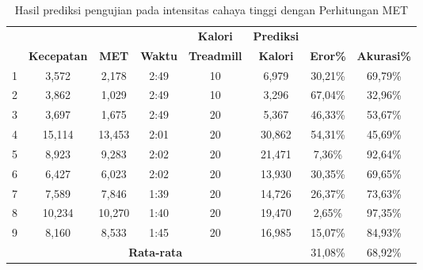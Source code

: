 \begin{longtable}{|c|c|c|c|c|c|c|c|}
  \caption{Hasil prediksi pengujian pada intensitas cahaya tinggi dengan Perhitungan MET}
  \label{tb:PengujianIntensitasTinggiAnalisaPrediksiPerhitungan}                                   \\
  \hline
  \rowcolor[HTML]{C0C0C0}
  & & & & \textbf{Kalori} & \textbf{Prediksi} & & \\
  \rowcolor[HTML]{C0C0C0}
  \multirow{-2}{*}{\textbf{Percobaan}} & \multirow{-2}{*}{\textbf{Kecepatan}} & \multirow{-2}{*}{\textbf{MET}} & \multirow{-2}{*}{\textbf{Waktu}} & \textbf{Treadmill} & \textbf{Kalori} & \multirow{-2}{*}{\textbf{Eror\%}} & \multirow{-2}{*}{\textbf{Akurasi\%}} \\
  \hline
  1   & 3,572   & 2,178    & 2:49    & 10   & 6,979   & 30,21\%     & 69,79\%   \\
  \hline
  2   & 3,862   & 1,029    & 2:49    & 10   & 3,296   & 67,04\%     & 32,96\%   \\
  \hline
  3   & 3,697   & 1,675    & 2:49    & 20   & 5,367   & 46,33\%     & 53,67\%   \\
  \hline
  4   & 15,114  & 13,453   & 2:01    & 20   & 30,862  & 54,31\%     & 45,69\%   \\
  \hline
  5   & 8,923   & 9,283    & 2:02    & 20   & 21,471  & 7,36\%      & 92,64\%   \\
  \hline
  6   & 6,427   & 6,023    & 2:02    & 20   & 13,930  & 30,35\%     & 69,65\%   \\
  \hline
  7   & 7,589   & 7,846    & 1:39    & 20   & 14,726  & 26,37\%     & 73,63\%   \\
  \hline
  8   & 10,234  & 10,270   & 1:40    & 20   & 19,470  & 2,65\%      & 97,35\%   \\
  \hline
  9   & 8,160   & 8,533    & 1:45    & 20   & 16,985  & 15,07\%     & 84,93\%   \\
  \hline

  \multicolumn{6}{|c|}{\textbf{Rata-rata}} & 31,08\% & 68,92\%  \\
  \hline
\end{longtable}

